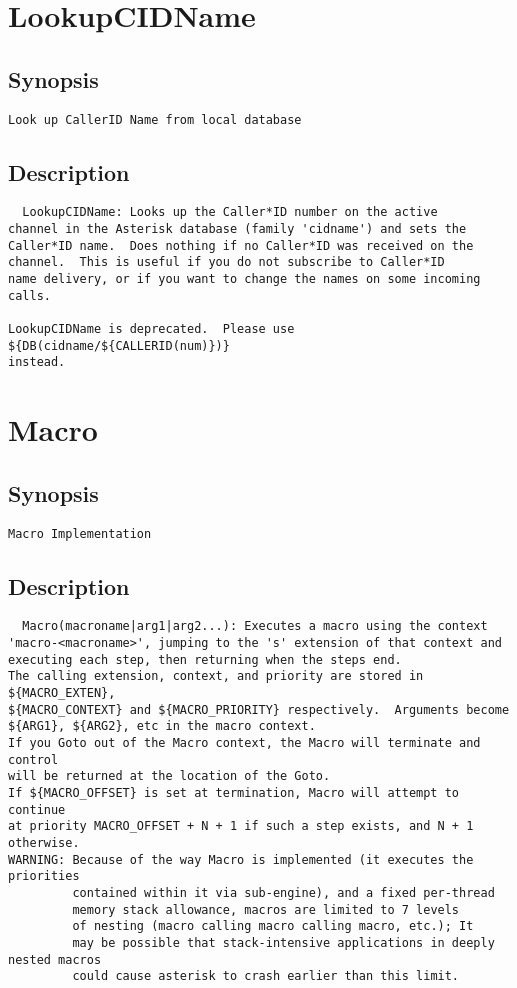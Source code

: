 \section{LookupCIDName}
\subsection{Synopsis}
\begin{verbatim}
Look up CallerID Name from local database
\end{verbatim}
\subsection{Description}
\begin{verbatim}
  LookupCIDName: Looks up the Caller*ID number on the active
channel in the Asterisk database (family 'cidname') and sets the
Caller*ID name.  Does nothing if no Caller*ID was received on the
channel.  This is useful if you do not subscribe to Caller*ID
name delivery, or if you want to change the names on some incoming
calls.

LookupCIDName is deprecated.  Please use ${DB(cidname/${CALLERID(num)})}
instead.

\end{verbatim}


\section{Macro}
\subsection{Synopsis}
\begin{verbatim}
Macro Implementation
\end{verbatim}
\subsection{Description}
\begin{verbatim}
  Macro(macroname|arg1|arg2...): Executes a macro using the context
'macro-<macroname>', jumping to the 's' extension of that context and
executing each step, then returning when the steps end. 
The calling extension, context, and priority are stored in ${MACRO_EXTEN}, 
${MACRO_CONTEXT} and ${MACRO_PRIORITY} respectively.  Arguments become
${ARG1}, ${ARG2}, etc in the macro context.
If you Goto out of the Macro context, the Macro will terminate and control
will be returned at the location of the Goto.
If ${MACRO_OFFSET} is set at termination, Macro will attempt to continue
at priority MACRO_OFFSET + N + 1 if such a step exists, and N + 1 otherwise.
WARNING: Because of the way Macro is implemented (it executes the priorities
         contained within it via sub-engine), and a fixed per-thread
         memory stack allowance, macros are limited to 7 levels
         of nesting (macro calling macro calling macro, etc.); It
         may be possible that stack-intensive applications in deeply nested macros
         could cause asterisk to crash earlier than this limit.

\end{verbatim}


